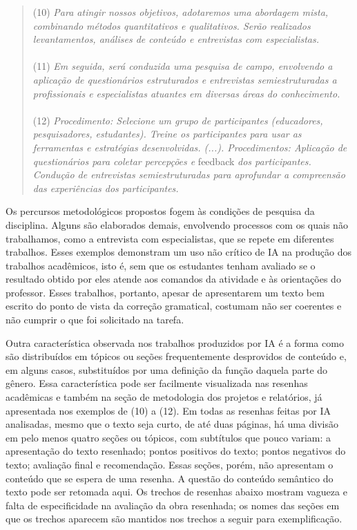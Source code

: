 \documentclass[portuguese]{textolivre}
\begin{document}
\begin{quote}
(10) \textit{Para atingir nossos objetivos, adotaremos uma abordagem mista, combinando métodos quantitativos e qualitativos. Serão realizados levantamentos, análises de conteúdo e entrevistas com especialistas.}
\\
\\
(11) \textit{Em seguida, será conduzida uma pesquisa de campo, envolvendo a aplicação de questionários estruturados e entrevistas semiestruturadas a profissionais e especialistas atuantes em diversas áreas do conhecimento.}
\\
\\
(12) \textit{Procedimento: Selecione um grupo de participantes (educadores, pesquisadores, estudantes). Treine os participantes para usar as ferramentas e estratégias desenvolvidas. (...). Procedimentos: Aplicação de questionários para coletar percepções e }feedback\textit{ dos participantes. Condução de entrevistas semiestruturadas para aprofundar a compreensão das experiências dos participantes.}
\end{quote}

Os percursos metodológicos propostos fogem às condições de pesquisa da disciplina. Alguns são elaborados demais, envolvendo processos com os quais não trabalhamos, como a entrevista com especialistas, que se repete em diferentes trabalhos. Esses exemplos demonstram um uso não crítico de IA na produção dos trabalhos acadêmicos, isto é, sem que os estudantes tenham avaliado se o resultado obtido por eles atende aos comandos da atividade e às orientações do professor. Esses trabalhos, portanto, apesar de apresentarem um texto bem escrito do ponto de vista da correção gramatical, costumam não ser coerentes e não cumprir o que foi solicitado na tarefa.

Outra característica observada nos trabalhos produzidos por IA é a forma como são distribuídos em tópicos ou seções frequentemente desprovidos de conteúdo e, em alguns casos, substituídos por uma definição da função daquela parte do gênero. Essa característica pode ser facilmente visualizada nas resenhas acadêmicas e também na seção de metodologia dos projetos e relatórios, já apresentada nos exemplos de (10) a (12). Em todas as resenhas feitas por IA analisadas, mesmo que o texto seja curto, de até duas páginas, há uma divisão em pelo menos quatro seções ou tópicos, com subtítulos que pouco variam: a apresentação do texto resenhado; pontos positivos do texto; pontos negativos do texto; avaliação final e recomendação. Essas seções, porém, não apresentam o conteúdo que se espera de uma resenha. A questão do conteúdo semântico do texto pode ser retomada aqui. Os trechos de resenhas abaixo mostram vagueza e falta de especificidade na avaliação da obra resenhada; os nomes das seções em que os trechos aparecem são mantidos nos trechos a seguir para exemplificação.
\end{document}
